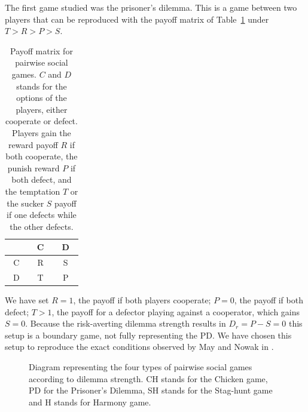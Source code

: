 The first game studied was the prisoner's dilemma. This is a game between two players that can be reproduced with the payoff matrix of Table~\ref{tab:PayoffMatrix} under $T>R>P>S$.



\begin{table}[H]
\centering
\label{tab:PayoffMatrix}
    \begin{tabular}{c|c c}
        ~& ~C~ & ~D~  \\
        \hline
        ~C~ & R & S  \\
        ~D~ & T & P
    \end{tabular}
\caption{Payoff matrix for pairwise social games. $C$ and $D$ stands for the options of the players, either cooperate or defect. Players gain the reward payoff $R$ if both cooperate, the punish reward $P$ if both defect, and the temptation $T$ or the sucker $S$ payoff if one defects while the other defects.}
\end{table}



 We have set $R = 1$, the payoff if both players cooperate; $P = 0$, the payoff if both defect; $T > 1$,  the payoff for a defector playing against a cooperator, which gains $S = 0$. Because the risk-averting dilemma strength results in $D_r= P - S = 0$ this setup is a boundary game, not fully representing the PD. We have chosen this setup to reproduce the exact conditions observed by May and Nowak in \cite{SpatialChaos}.


\begin{figure}
    \centering
{}
    \caption{Diagram representing the four types of pairwise social games according to dilemma strength. CH stands for the Chicken game, PD for the Prisoner's Dilemma, SH stands for the Stag-hunt game and H stands for Harmony game. }
    \label{fig:SocialGames}
\end{figure}


